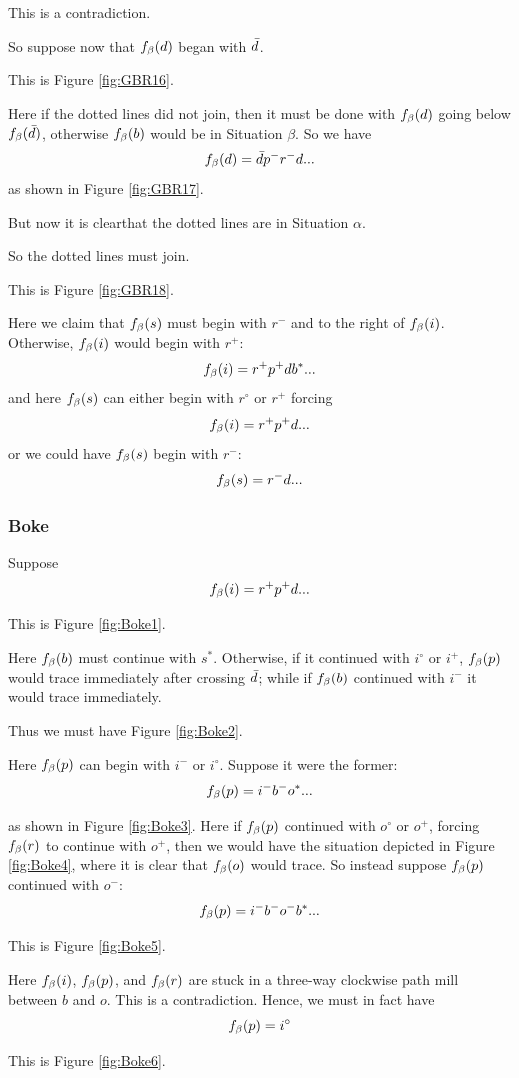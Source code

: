This is a contradiction.

So suppose now that $f_\beta(d)$ began with $\bar{d}$. 

This is Figure \ref{fig:GBR16}.

Here if the dotted lines did not join, then it must be done with $f_\beta(d)$ going below $f_\beta(\bar{d})$, otherwise $f_\beta(b)$ would be in Situation $\beta$. So we have
\[
f_\beta(d) = \bar{d} p^- r^- d...
\]
as shown in Figure \ref{fig:GBR17}.

But now it is clearthat the dotted lines are in Situation $\alpha$.

So the dotted lines must join.

This is Figure \ref{fig:GBR18}.

Here we claim that $f_\beta(s)$ must begin with $r^-$ and to the right of $f_\beta(i)$. Otherwise, $f_\beta(i)$ would begin with $r^+$:
\[
f_\beta(i) = r^+ p^+ d b^*...
\]
and here $f_\beta(s)$ can either begin with $r^\circ$ or $r^+$ forcing
\[
f_\beta(i) = r^+ p^+ d...
\]
or we could have $f_\beta(s)$ begin with $r^-$:
\[
f_\beta(s) = r^- d...
\]

\subsubsection{Boke}\label{Boke}
Suppose
\[
f_\beta(i) = r^+ p^+ d...
\]


This is Figure \ref{fig:Boke1}.

Here $f_\beta(b)$ must continue with $s^*$. Otherwise, if it continued with $i^\circ$ or $i^+$, $f_\beta(p)$ would trace immediately after crossing $\bar{d}$; while if $f_\beta(b)$ continued with $i^-$ it would trace immediately. 

Thus we must have Figure \ref{fig:Boke2}.

Here $f_\beta(p)$ can begin with $i^-$ or $i^\circ$. Suppose it were the former:
\[
f_\beta(p) = i^- b^- o^*...
\]

as shown in Figure \ref{fig:Boke3}. Here if $f_\beta(p)$ continued with $o^\circ$ or $o^+$, forcing $f_\beta(r)$ to continue with $o^+$, then we would have the situation depicted in Figure \ref{fig:Boke4}, where it is clear that $f_\beta(o)$ would trace. So instead suppose $f_\beta(p)$ continued with $o^-$:
\[
f_\beta(p) = i^- b^- o^-b^*...
\]

This is Figure \ref{fig:Boke5}.

Here $f_\beta(i)$, $f_\beta(p)$, and $f_\beta(r)$ are stuck in a three-way clockwise path mill between $b$ and $o$. This is a contradiction. Hence, we must in fact have
\[
f_\beta(p) = i^\circ
\]

This is Figure \ref{fig:Boke6}.

